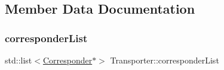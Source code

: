 \subsection{Member Data Documentation}
\mbox{\label{class_transporter_afd7004c5986280b5c65aac41c66a1ec7}} 
\subsubsection{\texorpdfstring{corresponderList}{corresponderList}}
{\footnotesize\ttfamily std\+::list$<$\mbox{\hyperlink{class_corresponder}{Corresponder}}$\ast$$>$ Transporter\+::corresponder\+List\hspace{0.3cm}{\ttfamily [protected]}}

